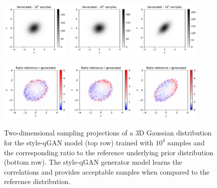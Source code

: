 \documentclass[twocolumn,preprintnumbers,superscriptaddress]{revtex4-2}
\begin{document}
\begin{figure}
  \includegraphics[width=0.3\textwidth]{plots/3Dgaussian_posdef/1-2_FAKE_100k.pdf}%
  \includegraphics[width=0.3\textwidth]{plots/3Dgaussian_posdef/2-3_FAKE_100k.pdf}%
  \includegraphics[width=0.3\textwidth]{plots/3Dgaussian_posdef/3-1_FAKE_100k.pdf}

  \includegraphics[width=0.3\textwidth]{plots/3Dgaussian_posdef/1-2_RATIO_100k.pdf}%
  \includegraphics[width=0.3\textwidth]{plots/3Dgaussian_posdef/2-3_RATIO_100k.pdf}%
  \includegraphics[width=0.3\textwidth]{plots/3Dgaussian_posdef/3-1_RATIO_100k.pdf}

  \caption{\label{fig:3dgauss}Two-dimensional sampling projections of a 3D
  Gaussian distribution for the style-qGAN model (top row) trained with $10^4$ samples
  and the corresponding ratio to the reference underlying prior distribution
  (bottom row). The style-qGAN generator model learns the correlations and provides
  acceptable samples when compared to the reference distribution.}
\end{figure}
\end{document}
